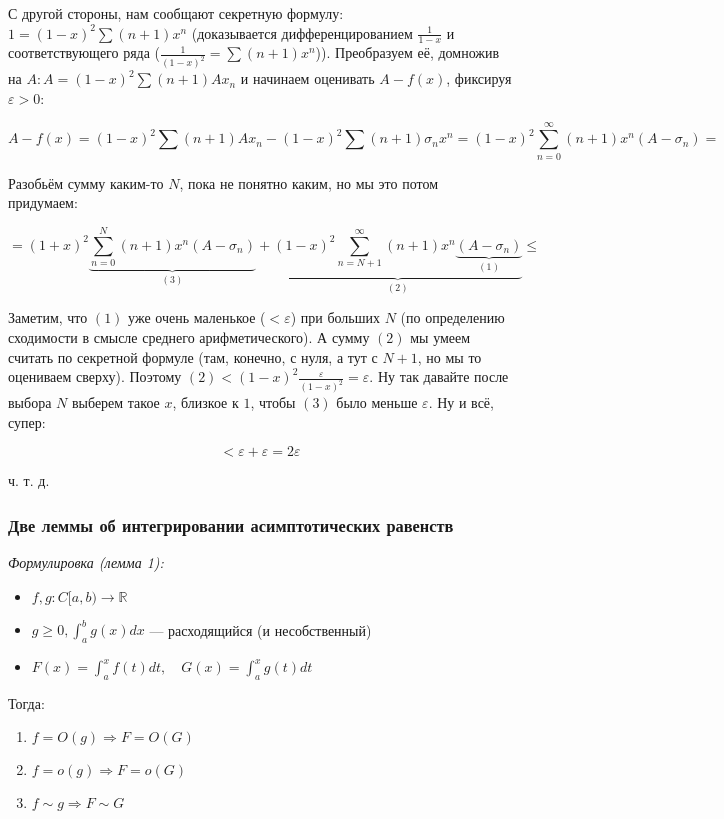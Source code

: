 \documentclass{article}
\begin{document}
С другой стороны, нам сообщают секретную формулу: $1 = (1 - x)^2\sum(n + 1)x^n$ (доказывается дифференцированием $\frac{1}{1 - x}$ и соответствующего ряда ($\frac{1}{(1 - x)^2} = \sum (n + 1)x^n$)). Преобразуем её, домножив на $A: A = (1 - x)^2\sum (n + 1)A x_n$ и начинаем оценивать $A - f(x)$, фиксируя $\varepsilon > 0$:

\[A - f(x) = (1 - x)^2\sum (n + 1)A x_n - (1 - x)^2\sum (n + 1)\sigma_n x^n = (1 - x)^2\sum_{n = 0}^{\infty} (n + 1) x^n (A - \sigma_n) = \]

Разобьём сумму каким-то $N$, пока не понятно каким, но мы это потом придумаем: 

\[= (1 + x)^2 \underbrace{\sum_{n = 0}^{N} (n + 1) x^n (A - \sigma_n)}_{(3)} + \underbrace{(1 - x)^2 \sum_{n = N + 1}^{\infty} (n + 1) x^n \underbrace{(A - \sigma_n)}_{(1)}}_{(2)} \le \]

Заметим, что $(1)$ уже очень маленькое ($< \varepsilon$) при больших $N$ (по определению сходимости в смысле среднего арифметического). А сумму $(2)$ мы умеем считать по секретной формуле (там, конечно, с нуля, а тут с $N + 1$, но мы то оцениваем сверху). Поэтому $(2) < (1 - x)^2\frac{\varepsilon}{(1 - x)^2 } = \varepsilon$. Ну так давайте после выбора $N$ выберем такое $x$, близкое к $1$, чтобы $(3)$ было меньше $\varepsilon$. Ну и всё, супер: 

\[< \varepsilon + \varepsilon = 2\varepsilon\]

ч. т. д. 

\subsubsection{Две леммы об интегрировании асимптотических равенств}
\textit{Формулировка (лемма 1):}

\begin{itemize}
    \item $f, g: C[a, b) \rightarrow \mathbb{R}$
    \item $g \ge 0, \int_a^b g(x) dx$ --- расходящийся (и несобственный)
    \item $F(x) = \int_a^x f(t) dt, \quad G(x) = \int_a^x g(t) dt$
\end{itemize}

Тогда:

\begin{enumerate}
    \item $f = O(g) \Rightarrow F = O(G)$
    \item $f = o(g) \Rightarrow F = o(G)$
    \item $f \sim g \Rightarrow F \sim G$
\end{enumerate}
\end{document}
